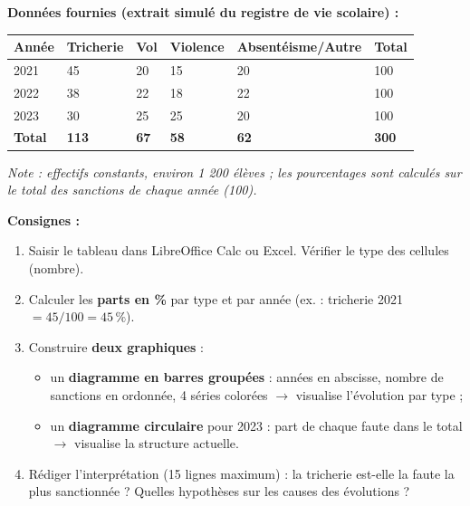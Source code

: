 \documentclass[11pt]{article}
\begin{document}
\begin{experience}
\textbf{Données fournies (extrait simulé du registre de vie scolaire) :}
\begin{center}
\begin{tabularx}{\linewidth}{|l|X|X|X|X|X|}\hline
\rowcolor{popblueL}\textbf{Année} & \textbf{Tricherie} & \textbf{Vol} & \textbf{Violence} & \textbf{Absentéisme/Autre} & \textbf{Total} \\ \hline
2021 & 45 & 20 & 15 & 20 & 100 \\ \hline
2022 & 38 & 22 & 18 & 22 & 100 \\ \hline
2023 & 30 & 25 & 25 & 20 & 100 \\ \hline
\textbf{Total} & \textbf{113} & \textbf{67} & \textbf{58} & \textbf{62} & \textbf{300} \\ \hline
\end{tabularx}
\end{center}
\textit{Note : effectifs constants, environ 1 200 élèves ; les pourcentages sont calculés sur le total des sanctions de chaque année (100).}

\textbf{Consignes :}
\begin{enumerate}
    \item Saisir le tableau dans LibreOffice Calc ou Excel. Vérifier le type des cellules (nombre).
    \item Calculer les \textbf{parts en \%} par type et par année (ex. : tricherie 2021 $= 45/100 = 45\,\%$).
    \item Construire \textbf{deux graphiques} :
        \begin{itemize}
            \item un \textbf{diagramme en barres groupées} : années en abscisse, nombre de sanctions en ordonnée, 4 séries colorées $\to$ visualise l'évolution par type ;
            \item un \textbf{diagramme circulaire} pour 2023 : part de chaque faute dans le total $\to$ visualise la structure actuelle.
        \end{itemize}
    \item Rédiger l'interprétation (15 lignes maximum) : la tricherie est-elle la faute la plus sanctionnée ? Quelles hypothèses sur les causes des évolutions ?
\end{enumerate}
\end{experience}
\end{document}
